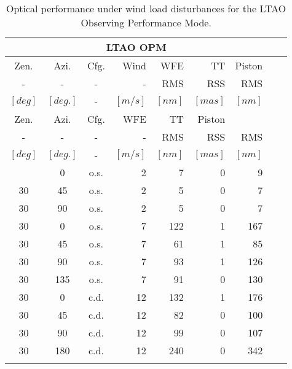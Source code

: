 \documentclass{gmto-book}
\begin{document}
\begin{longtable}{cccr||rrrrr}
  \caption{Optical performance under wind load disturbances for the LTAO
 Observing Performance Mode.} \label{tab:long} \\\hline\hline
  \multicolumn{7}{|c}{\textbf{LTAO OPM}}
  \\\hline\hline
  Zen. & Azi. & Cfg. & Wind  & WFE & TT & Piston \\
  - & -    & -    &  -   &  RMS & RSS  & RMS  \\
  $[deg]$  & $[deg.]$ & - & $[m/s]$ & $[nm]$& $[mas]$&
  $[nm]$ \\\hline\hline
  \endfirsthead

  Zen. & Azi. & Cfg.  & WFE & TT & Piston \\
  - & -    & -    &  -   &  RMS & RSS  & RMS  \\
  $[deg]$  & $[deg.]$ & - & $[m/s]$ & $[nm]$& $[mas]$&
  $[nm]$ \\\hline\hline
  
  \endhead

  \endfoot
  \hline \hline
  \endlastfoot
  30 & 0 & o.s. & 2    &     7 & 0 &    9 \\\hline  
  30 & 45 & o.s. & 2   &     5 & 0 &    7 \\\hline  
  30 & 90 & o.s. & 2   &     5 & 0 &    7 \\\hline\hline  
  30 & 0 & o.s. & 7    &   122 & 1 &  167 \\\hline  
  30 & 45 & o.s. & 7   &    61 & 1 &   85 \\\hline  
  30 & 90 & o.s. & 7   &    93 & 1 &  126 \\\hline  
  30 & 135 & o.s. & 7  &    91 & 0 &  130 \\\hline\hline  
  30 & 0 & c.d. & 12   &   132 & 1 &  176 \\\hline  
  30 & 45 & c.d. & 12  &    82 & 0 &  100 \\\hline  
  30 & 90 & c.d. & 12  &    99 & 0 &  107 \\\hline  
  30 & 180 & c.d. & 12 &   240 & 0 &  342 \\  
  
  \label{im-loads}
\end{longtable}
\end{document}
